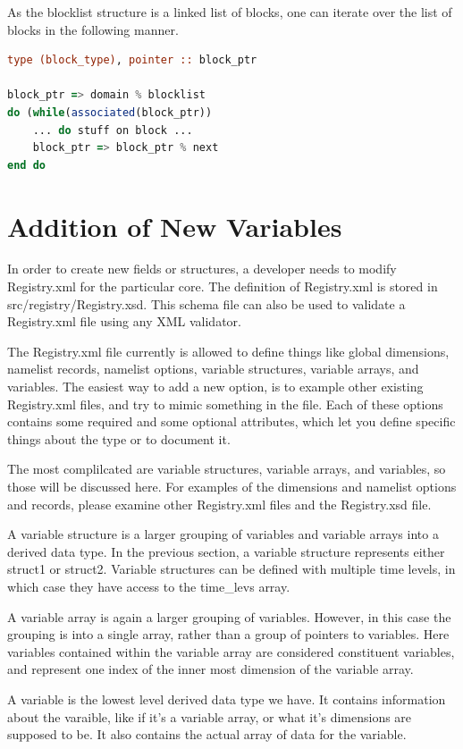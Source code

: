 \documentclass[11pt]{report}
\begin{document}
As the blocklist structure is a linked list of blocks, one can iterate over the
list of blocks in the following manner.

\begin{lstlisting}[language=fortran,escapechar=@,frame=single]
type (block_type), pointer :: block_ptr

block_ptr => domain % blocklist
do (while(associated(block_ptr))
	... do stuff on block ...
	block_ptr => block_ptr % next
end do
\end{lstlisting}

\section{Addition of New Variables}
In order to create new fields or structures, a developer needs to modify
Registry.xml for the particular core. The definition of Registry.xml is stored
in src/registry/Registry.xsd. This schema file can also be used to validate a
Registry.xml file using any XML validator.

The Registry.xml file currently is allowed to define things like global
dimensions, namelist records, namelist options, variable structures, variable
arrays, and variables. The easiest way to add a new option, is to example other
existing Registry.xml files, and try to mimic something in the file. Each of
these options contains some required and some optional attributes, which let
you define specific things about the type or to document it.

The most complilcated are variable structures, variable arrays, and variables,
so those will be discussed here. For examples of the dimensions and namelist
options and records, please examine other Registry.xml files and the
Registry.xsd file.

A variable structure is a larger grouping of variables and variable arrays into
a derived data type. In the previous section, a variable structure represents
either struct1 or struct2. Variable structures can be defined with multiple
time levels, in which case they have access to the time\_levs array.

A variable array is again a larger grouping of variables. However, in this case
the grouping is into a single array, rather than a group of pointers to
variables. Here variables contained within the variable array are considered
constituent variables, and represent one index of the inner most dimension of
the variable array.

A variable is the lowest level derived data type we have. It contains
information about the varaible, like if it's a variable array, or what it's
dimensions are supposed to be. It also contains the actual array of data for
the variable.
\end{document}
